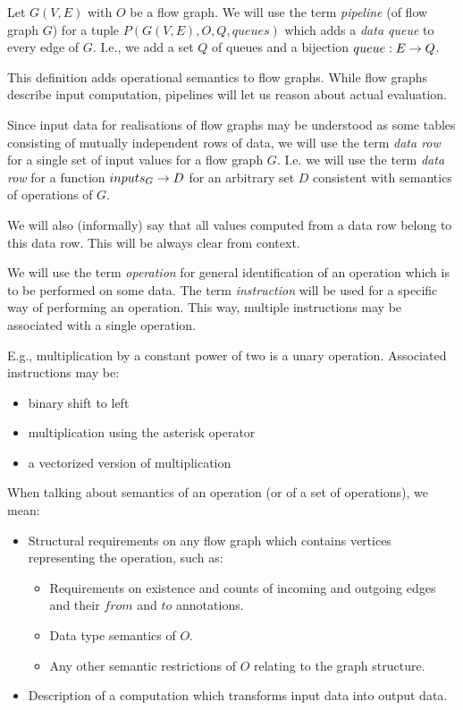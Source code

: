   Let $G(V,E)$ with $O$ be a flow graph. We will use the term \emph{pipeline} (of flow graph $G$) for a tuple $P(G(V,E), O, Q, queues)$ which adds a \emph{data queue} to every edge of $G$. I.e., we add a set $Q$ of queues and a bijection $queue: E \rightarrow Q$. 
\myenddef

This definition adds operational semantics to flow graphs. While flow graphs describe input computation, pipelines will let us reason about actual evaluation.


  Since input data for realisations of flow graphs may be understood as some tables consisting of mutually independent rows of data, we will use the term \emph{data row} for a single set of input values for a flow graph $G$. I.e. we will use the term \emph{data row} for a function $inputs_G \rightarrow D$ for an arbitrary set $D$ consistent with semantics of operations of $G$.

  We will also (informally) say that all values computed from a data row belong to this data row. This will be always clear from context.
\myenddef


We will use the term \emph{operation} for general identification of an operation which is to be performed on some data. The term \emph{instruction} will be used for a specific way of performing an operation. This way, multiple instructions may be associated with a single operation.
\myenddef

E.g., multiplication by a constant power of two is a unary operation. Associated instructions may be:
\begin{itemize}
  \item binary shift to left
  \item multiplication using the asterisk operator
  \item a vectorized version of multiplication
\end{itemize}

  When talking about semantics of an operation (or of a set of operations), we mean:
  \begin{itemize}
    \item Structural requirements on any flow graph which contains vertices representing the operation, such as:
    \begin{itemize}
      \item Requirements on existence and counts of incoming and outgoing edges and their $from$ and $to$ annotations.
      \item Data type semantics of $O$.
      \item Any other semantic restrictions of $O$ relating to the graph structure. 
    \end{itemize}
    \item Description of a computation which transforms input data into output data.
  \end{itemize}
\myenddef

